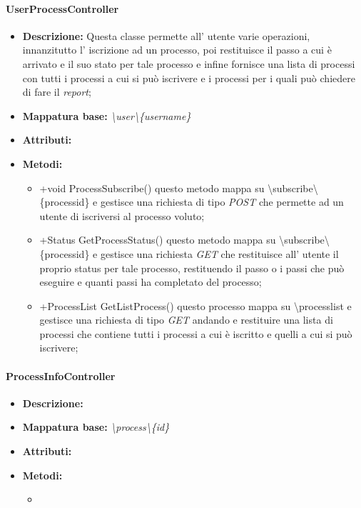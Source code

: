 \paragraph{UserProcessController}%
\begin{itemize}
	\item \textbf{Descrizione: } Questa classe permette all' utente varie operazioni, innanzitutto l' iscrizione ad un processo, poi restituisce il passo a cui è arrivato e il suo stato per tale processo e infine fornisce una lista di processi con tutti i processi a cui si può iscrivere e i processi per i quali può chiedere di fare il \textit{report};
	\item \textbf{Mappatura base: } \textit{\textbackslash user\textbackslash \{username\}}
	\item \textbf{Attributi: }
	\item \textbf{Metodi: }\begin{itemize}
					\item +void ProcessSubscribe() questo metodo mappa su \textbackslash subscribe\textbackslash \{processid\} e gestisce una richiesta di tipo \textit{POST} che permette ad un utente di iscriversi al processo voluto;
					\item +Status GetProcessStatus() questo metodo mappa su \textbackslash subscribe\textbackslash \{processid\} e gestisce una richiesta \textit{GET} che restituisce all' utente il proprio status per tale processo, restituendo il passo o i passi che può eseguire e quanti passi ha completato del processo;
					\item +ProcessList GetListProcess() questo processo mappa su \textbackslash processlist e gestisce una richiesta di tipo \textit{GET} andando e restituire una lista di processi che contiene tutti i processi  a cui è iscritto e quelli a cui si può iscrivere;
				\end{itemize}
\end{itemize}
\paragraph{ProcessInfoController}%
\begin{itemize}
	\item \textbf{Descrizione: } 
	\item \textbf{Mappatura base: } \textit{\textbackslash process\textbackslash \{id\}}
	\item \textbf{Attributi: }
	\item \textbf{Metodi: }\begin{itemize}
					\item 
				\end{itemize}
\end{itemize}
